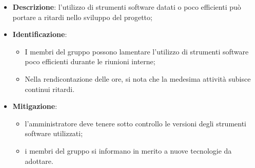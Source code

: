 \label{strumenti-software-inadeguati}
\begin{itemize}
	\item \textbf{Descrizione}: l'utilizzo di strumenti software datati o poco
	      efficienti può portare a ritardi nello sviluppo del progetto;

	\item \textbf{Identificazione}:
	      \begin{itemize}
		      \item I membri del gruppo possono lamentare l'utilizzo di strumenti
		            software poco efficienti durante le riunioni interne;
		      \item Nella rendicontazione delle ore, si nota che la medesima
		            attività subisce continui ritardi.
	      \end{itemize}

	\item \textbf{Mitigazione}:
	      \begin{itemize}
		      \item l'amministratore deve tenere sotto controllo le versioni
		            degli strumenti software utilizzati;

		      \item i membri del gruppo si informano in merito a nuove
		            tecnologie da adottare.
	      \end{itemize}
\end{itemize}

